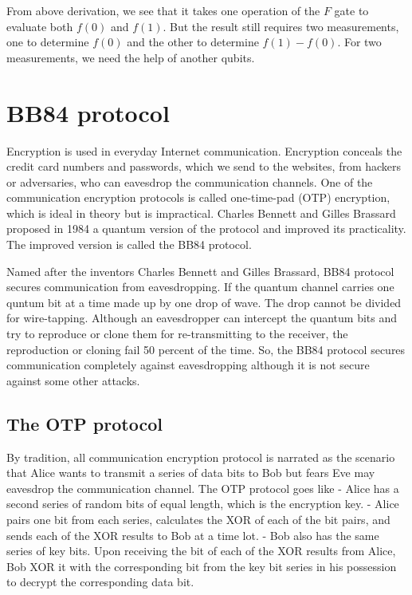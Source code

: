 \documentclass{book}
\begin{document}
From above derivation, we see that it takes one operation of the $F$ gate to evaluate both $f(0)$ and $f(1)$. But the result still requires two measurements, one to determine $f(0)$ and the other to determine $f(1)-f(0)$. For two measurements, we need the help of another qubits.

\section{BB84 protocol}
Encryption is used in everyday Internet communication. Encryption conceals the credit card numbers and passwords, which we send to the websites, from hackers or adversaries, who can eavesdrop the communication channels. One of the communication encryption protocols is called one-time-pad (OTP) encryption, which is ideal in theory but is impractical. Charles Bennett and Gilles Brassard proposed in 1984 a quantum version of the protocol and improved its practicality. The improved version is called the BB84 protocol\cite{BB84}.

Named after the inventors Charles Bennett and Gilles Brassard, BB84 protocol secures communication from eavesdropping. If the quantum channel carries one quntum bit at a time made up by one drop of wave. The drop cannot be divided for wire-tapping. Although an eavesdropper can intercept the quantum bits and try to reproduce or clone them for re-transmitting to the receiver, the reproduction or cloning fail 50 percent of the time. So, the BB84 protocol secures communication completely against eavesdropping although it is not secure against some other attacks.

\subsection{The OTP protocol}
By tradition, all communication encryption protocol is narrated as the scenario that Alice wants to transmit a series of data bits to Bob but fears Eve may eavesdrop the communication channel\cite{Schneier}. The OTP protocol goes like
- Alice has a second series of random bits of equal length, which is the encryption key.
- Alice pairs one bit from each series, calculates the XOR of each of the bit pairs, and sends each of the XOR results to Bob at a time lot.
- Bob also has the same series of key bits. Upon receiving the bit of each of the XOR results from Alice, Bob XOR it with the corresponding bit from the key bit series in his possession to decrypt the corresponding data bit.
\end{document}
